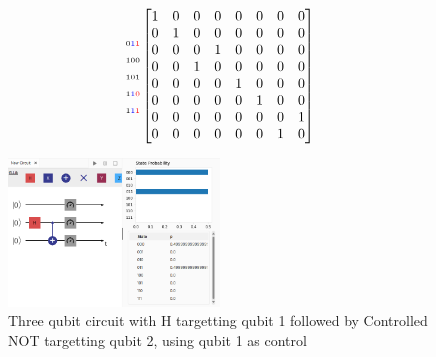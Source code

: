 \documentclass[conference]{IEEEtran}
\begin{document}
\begin{appendices}
\begin{multline*}
\begin{matrix}
\begin{matrix}
            {\scriptscriptstyle 0\textcolor{blue}{1}\textcolor{red}{1}} \\
            {\scriptscriptstyle 100} \\
            {\scriptscriptstyle 101} \\
            {\scriptscriptstyle 1\textcolor{blue}{1}\textcolor{red}{0}} \\
            {\scriptscriptstyle 1\textcolor{blue}{1}\textcolor{red}{1}}
        \end{matrix}
        \begin{bmatrix}
            1 & 0 & 0 & 0 & 0 & 0 & 0 & 0 \\
            0 & 1 & 0 & 0 & 0 & 0 & 0 & 0 \\
            0 & 0 & 0 & 1 & 0 & 0 & 0 & 0 \\
            0 & 0 & 1 & 0 & 0 & 0 & 0 & 0 \\
            0 & 0 & 0 & 0 & 1 & 0 & 0 & 0 \\
            0 & 0 & 0 & 0 & 0 & 1 & 0 & 0 \\
            0 & 0 & 0 & 0 & 0 & 0 & 0 & 1 \\
            0 & 0 & 0 & 0 & 0 & 0 & 1 & 0 \\
        \end{bmatrix}
    \end{matrix}
\end{multline*}

\begin{figure}[tbp]
    \centerline{
        \includegraphics[width=0.5\textwidth]{img/three-qubit-bell-matrix-construction-example.png}
    }
    \caption{Three qubit circuit with H targetting qubit 1 followed by Controlled NOT targetting qubit 2, using qubit 1 as control}
    \label{fig:examplethreequbitscontrolledgateconstruction}
\end{figure}


\end{appendices}
\end{document}

